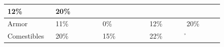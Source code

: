 \begin{longtable}{|>{\RaggedRight}p{0.15554\linewidth}|>{\RaggedRight}p{0.19251\linewidth}|>{\RaggedRight}p{0.19844\linewidth}|>{\RaggedRight}p{0.15446\linewidth}|>{\RaggedRight}p{0.15619\linewidth}|}
\hspace*{0pt}\ignorespaces{}\hspace*{0pt}12\%&\hspace*{0pt}\ignorespaces{}\hspace*{0pt}20\%\\ \hline \hspace*{0pt}\ignorespaces{}\hspace*{0pt}Armor\footnotemark[35]&\hspace*{0pt}\ignorespaces{}\hspace*{0pt}11\%&\hspace*{0pt}\ignorespaces{}\hspace*{0pt}0\%&\hspace*{0pt}\ignorespaces{}\hspace*{0pt}12\%&\hspace*{0pt}\ignorespaces{}\hspace*{0pt}20\%\\ \hline \hspace*{0pt}\ignorespaces{}\hspace*{0pt}Comestibles\footnotemark[36]&\hspace*{0pt}\ignorespaces{}\hspace*{0pt}20\%&\hspace*{0pt}\ignorespaces{}\hspace*{0pt}15\%&\hspace*{0pt}\ignorespaces{}\hspace*{0pt}22\%&\hspace*{0pt}\ignorespaces{}\h
\end{longtable}
